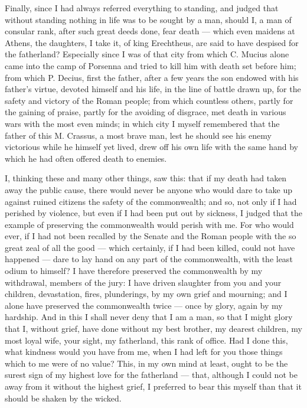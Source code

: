  Finally, since I had always referred everything to standing, and judged that without standing nothing in life was to be sought by a man, should I, a man of consular rank, after such great deeds done, fear death --- which even maidens at Athens, the daughters, I take it, of king Erechtheus, are said to have despised for the fatherland? Especially since I was of that city from which C. Mucius alone came into the camp of Porsenna and tried to kill him with death set before him; from which P. Decius, first the father, after a few years the son endowed with his father's virtue, devoted himself and his life, in the line of battle drawn up, for the safety and victory of the Roman people; from which countless others, partly for the gaining of praise, partly for the avoiding of disgrace, met death in various wars with the most even minds; in which city I myself remembered that the father of this M. Crassus, a most brave man, lest he should see his enemy victorious while he himself yet lived, drew off his own life with the same hand by which he had often offered death to enemies.

 I, thinking these and many other things, saw this: that if my death had taken away the public cause, there would never be anyone who would dare to take up against ruined citizens the safety of the commonwealth; and so, not only if I had perished by violence, but even if I had been put out by sickness, I judged that the example of preserving the commonwealth would perish with me. For who would ever, if I had not been recalled by the Senate and the Roman people with the so great zeal of all the good --- which certainly, if I had been killed, could not have happened --- dare to lay hand on any part of the commonwealth, with the least odium to himself? I have therefore preserved the commonwealth by my withdrawal, members of the jury: I have driven slaughter from you and your children, devastation, fires, plunderings, by my own grief and mourning; and I alone have preserved the commonwealth twice --- once by glory, again by my hardship. And in this I shall never deny that I am a man, so that I might glory that I, without grief, have done without my best brother, my dearest children, my most loyal wife, your sight, my fatherland, this rank of office. Had I done this, what kindness would you have from me, when I had left for you those things which to me were of no value? This, in my own mind at least, ought to be the surest sign of my highest love for the fatherland --- that, although I could not be away from it without the highest grief, I preferred to bear this myself than that it should be shaken by the wicked.

